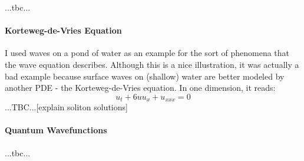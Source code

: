  ...tbc...



\paragraph{Korteweg-de-Vries Equation}
I used waves on a pond of water as an example for the sort of phenomena that the wave equation describes. Although this is a nice illustration, it was actually a bad example because surface waves on (shallow) water are better modeled by another PDE - the Korteweg-de-Vries equation. In one dimension, it reads:
\begin{equation}
 u_t + 6 u u_x + u_{xxx} = 0
\end{equation}
...TBC...[explain soliton solutions]




\paragraph{Quantum Wavefunctions} ...tbc...



% 






